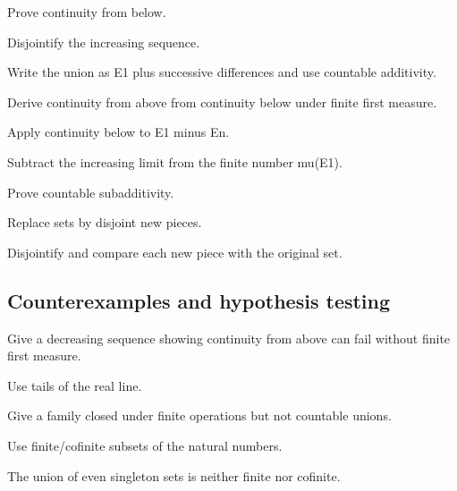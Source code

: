 \begin{exercise}\label{exr:iii01-expand-07}
Prove continuity from below.
\end{exercise}
\begin{hint}
Disjointify the increasing sequence.
\end{hint}
\begin{solution}
Write the union as E1 plus successive differences and use countable additivity.
\end{solution}

\begin{exercise}\label{exr:iii01-expand-08}
Derive continuity from above from continuity below under finite first measure.
\end{exercise}
\begin{hint}
Apply continuity below to E1 minus En.
\end{hint}
\begin{solution}
Subtract the increasing limit from the finite number mu(E1).
\end{solution}

\begin{exercise}\label{exr:iii01-expand-09}
Prove countable subadditivity.
\end{exercise}
\begin{hint}
Replace sets by disjoint new pieces.
\end{hint}
\begin{solution}
Disjointify and compare each new piece with the original set.
\end{solution}

\subsection*{Counterexamples and hypothesis testing}

\begin{exercise}\label{exr:iii01-expand-10}
Give a decreasing sequence showing continuity from above can fail without finite first measure.
\end{exercise}
\begin{hint}
Use tails of the real line.
\end{hint}
\begin{solution}
[n,infinity) decreases to empty but every term has infinite measure.
\end{solution}

\begin{exercise}\label{exr:iii01-expand-11}
Give a family closed under finite operations but not countable unions.
\end{exercise}
\begin{hint}
Use finite/cofinite subsets of the natural numbers.
\end{hint}
\begin{solution}
The union of even singleton sets is neither finite nor cofinite.
\end{solution}

